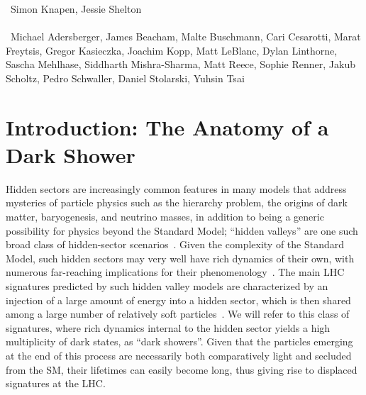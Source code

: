 ~Simon Knapen, Jessie Shelton \\
\text{ \; }\\
~Michael Adersberger, James Beacham, Malte Buschmann, Cari Cesarotti, Marat Freytsis, Gregor Kasieczka, Joachim Kopp, Matt LeBlanc, Dylan Linthorne,  Sascha Mehlhase, Siddharth Mishra-Sharma, Matt Reece, Sophie Renner, Jakub Scholtz, Pedro Schwaller, Daniel Stolarski, Yuhsin Tsai 
\text{ \; }\\

\section{Introduction: The Anatomy of a Dark Shower}
\label{sec:darkshowerintro}

Hidden sectors are increasingly common features in many models that address mysteries of particle physics such as the hierarchy problem, the origins of dark matter, baryogenesis, and neutrino masses, in addition to being a generic possibility for physics beyond the Standard Model; ``hidden valleys'' are one such broad class of hidden-sector scenarios~\cite{Strassler:2006im,Han:2007ae}. Given the complexity of the Standard Model, such hidden sectors may very well have rich dynamics of their own, with numerous far-reaching implications for their phenomenology~\cite{Strassler:2006ri,Strassler:2006qa,Strassler:2008bv,Strassler:2008fv,Juknevich:2009ji}. The main LHC signatures predicted by such hidden valley models are characterized by an injection of a large amount of energy into a hidden sector, which is then shared among a large number of relatively soft particles~\cite{Strassler:2008bv}. We will refer to this class of signatures, where rich dynamics internal to the hidden sector yields a high multiplicity of dark states, as ``dark showers''. Given that the particles emerging at the end of this process are necessarily both comparatively light and secluded from the SM, their lifetimes can easily become long, thus giving rise to displaced signatures at the LHC.

